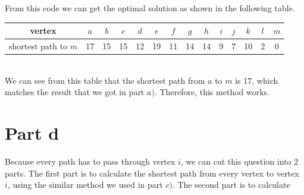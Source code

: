 \documentclass[11pt]{scrreprt}
\begin{document}
From this code we can get the optimal solution as shown in the following table.\\
\begin{tabular}{|c|c|c|c|c|c|c|c|c|c|c|c|c|c|}
	\hline vertex & $a$   &  $b$ & $c$ & $d$ & $e$ & $f$ & $g$ & $h$ & $i$  & $j$ & $k$ & $l$ & $m$   \\
	\hline shortest path to $m$ & 17 & 15 & 15 & 12 & 19 & 11 & 14 & 14 & 9 & 7 & 10 & 2 & 0 \\
	\hline
\end{tabular} \\

We can see from this table that the shortest path from $a$ to $m$ is 17, which matches the result that we got in part $a)$. Therefore, this method works.

\section{Part d}

Because every path has to pass through vertex $i$, we can cut this question into 2 parts. The first part is to calculate the shortest path from every vertex to vertex $i$, using the similar method we used in part $c)$. The second part is to calculate 
\end{document}
